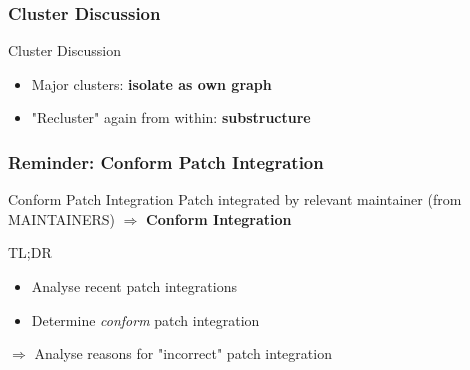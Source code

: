 \documentclass{beamer}
\begin{document}
	\begin{frame}
	\frametitle{Cluster Discussion}
		\begin{block}{Cluster Discussion}
			\begin{itemize}
				\item Major clusters: \textbf{isolate as own graph}
				\item "Recluster" again from within: \textbf{substructure}
			\end{itemize}
		\end{block}
		
	\end{frame}

	\begin{frame}
	\frametitle{Reminder: Conform Patch Integration} %
		\begin{alertblock}{Conform Patch Integration}
			Patch integrated by relevant maintainer (from MAINTAINERS) $\Rightarrow$ \textbf{Conform Integration}
		\end{alertblock}

		\begin{block}{TL;DR}
			\begin{itemize}
				\item Analyse recent patch integrations
				\item Determine \textit{conform} patch integration
			\end{itemize}
		\end{block}
		$\Rightarrow$ Analyse reasons for "incorrect" patch integration
	\end{frame}
\end{document}
